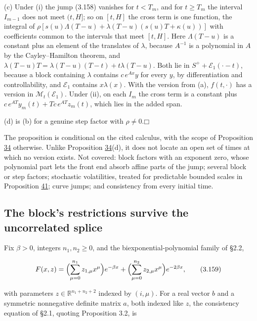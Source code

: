 \documentclass[11pt]{article}
\providecommand{\square}{\mdlgwhtsquare}
\begin{document}
(c) Under (i) the jump (3.158) vanishes for \(t<T_m\), and for \(t\ge T_m\) the interval \(I_{m-1}\) does not meet \((t,H]\); so on \([t,H]\) the cross term is one function, the integral of \(\rho[s(u)\Lambda(T-u)+\lambda(T-u)(s(u)T+\kappa(u))]\) with coefficients common to the intervals that meet \([t,H]\). Here \(\Lambda(T-u)\) is a constant plus an element of the translates of \(\lambda\), because \(A^{-1}\) is a polynomial in \(A\) by the Cayley--Hamilton theorem, and \(\lambda(T-u)T=\lambda(T-u)(T-t)+t\lambda(T-u)\). Both lie in \(S^++\mathcal E_1(\cdot-t)\), because a block containing \(\lambda\) contains \(c\,e^{Ax}y\) for every \(y\), by differentiation and controllability, and \(\mathcal E_1\) contains \(x\lambda(x)\). With the version from (a), \(f(t,\cdot)\) has a version in \(\mathcal M_t(\mathcal E_1)\). Under (ii), on each \(I_m\) the cross term is a constant plus \(c\,e^{AT}y_m(t)+Tc\,e^{AT}z_m(t)\), which lies in the added span.

(d) is (b) for a genuine step factor with \(\rho\neq0\).\hfill$\square$

The proposition is conditional on the cited calculus, with the scope of Proposition \hyperref[res:Proposition-34]{34} otherwise. Unlike Proposition \hyperref[res:Proposition-34]{34}(d), it does not locate an open set of times at which no version exists. Not covered: block factors with an exponent zero, whose polynomial part lets the front end absorb affine parts of the jump; several block or step factors; stochastic volatilities, treated for predictable bounded scales in Proposition \hyperref[res:Proposition-41]{41}; curve jumps; and consistency from every initial time.

\subsection{The block's restrictions survive the uncorrelated splice}\label{sec:3.32}

Fix \(\beta>0\), integers \(n_1,n_2\ge0\), and the biexponential-polynomial family of \cite{sharef2004conditions} §2.2,

\begin{equation*}
F(x,z)=\Bigl(\sum_{\mu=0}^{n_1}z_{1,\mu}x^\mu\Bigr)e^{-\beta x}+\Bigl(\sum_{\mu=0}^{n_2}z_{2,\mu}x^\mu\Bigr)e^{-2\beta x}, \tag{3.159}\label{eq:3.159}
\end{equation*}

with parameters \(z\in\mathbb R^{n_1+n_2+2}\) indexed by \((i,\mu)\). For a real vector \(b\) and a symmetric nonnegative definite matrix \(a\), both indexed like \(z\), the consistency equation of \cite{sharef2004conditions} §2.1, quoting \cite{filipovic1999note} Proposition 3.2, is
\end{document}
